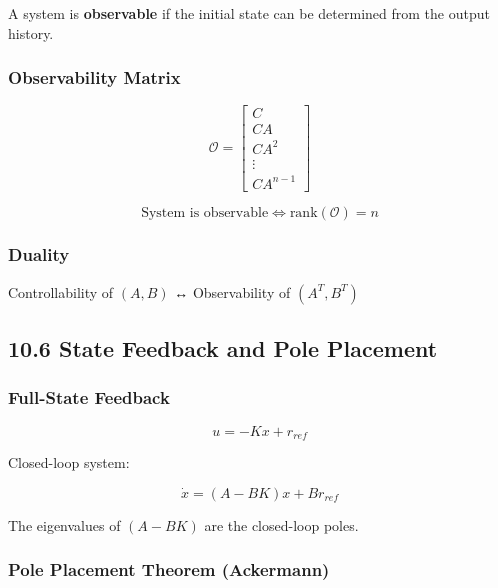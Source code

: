 \documentclass[11pt,a4paper]{book}
\begin{document}
A system is \textbf{observable} if the initial state can be determined from the output history.

\subsubsection{Observability Matrix}

\[\mathcal{O} = \begin{bmatrix} C \\ CA \\ CA^2 \\ \vdots \\ CA^{n-1} \end{bmatrix}\]

\[\boxed{\text{System is observable} \iff \text{rank}(\mathcal{O}) = n}\]

\subsubsection{Duality}

Controllability of $(A, B)$ ↔ Observability of $(A^T, B^T)$

\medskip\noindent\hrulefill\medskip

\subsection{10.6 State Feedback and Pole Placement}

\subsubsection{Full-State Feedback}

\[u = -Kx + r_{ref}\]

Closed-loop system:

\[\dot{x} = (A - BK)x + Br_{ref}\]

The eigenvalues of $(A - BK)$ are the closed-loop poles.

\subsubsection{Pole Placement Theorem (Ackermann)}
\end{document}

